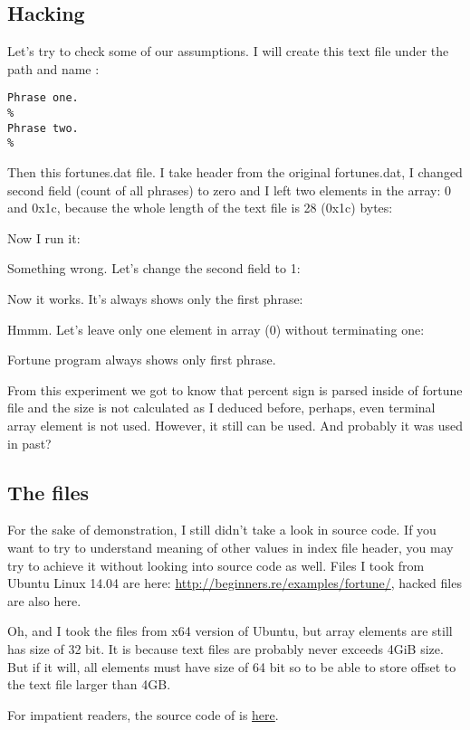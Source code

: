 \subsection{Hacking}

Let's try to check some of our assumptions.
I will create this text file under the path and name :

\begin{lstlisting}
Phrase one.
%
Phrase two.
%
\end{lstlisting}

Then this fortunes.dat file. I take header from the original fortunes.dat, I changed second field (count of all phrases) to zero and I left two
elements in the array: 0 and 0x1c, because the whole length of the text  file is 28 (0x1c) bytes:



Now I run it:



Something wrong. Let's change the second field to 1:



Now it works. It's always shows only the first phrase:



Hmmm. Let's leave only one element in array (0) without terminating one:



Fortune program always shows only first phrase.

From this experiment we got to know that percent sign is parsed inside of fortune file and the size is not calculated as
I deduced before, perhaps, even terminal array element is not used.
However, it still can be used. And probably it was used in past?


\subsection{The files}

For the sake of demonstration, I still didn't take a look in  source code.
If you want to try to understand meaning of other values in index file header, you may try to achieve it without looking into source code as well.
Files I took from Ubuntu Linux 14.04 are here: \url{http://beginners.re/examples/fortune/}, hacked files are also here.

Oh, and I took the files from x64 version of Ubuntu, but array elements are still has size of 32 bit.
It is because  text files are probably never exceeds 4\ac{GiB} size.
But if it will, all elements must have size of 64 bit so to be able to store offset to the text file larger than 4GB.

For impatient readers, the source code of  is \href{https://launchpad.net/ubuntu/+source/fortune-mod/1:1.99.1-3.1ubuntu4}{here}.

